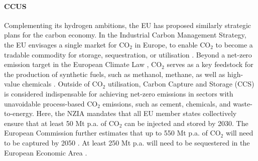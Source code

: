 \documentclass[pdflatex,sn-nature]{sn-jnl}%
\theoremstyle{thmstyleone}%
\theoremstyle{thmstyletwo}%
\theoremstyle{thmstylethree}%
\begin{document}
\paragraph{CCUS}
Complementing its hydrogen ambitions, the EU has proposed similarly strategic plans for the carbon economy. In the Industrial Carbon Management Strategy, the EU envisages a single market for CO$_2$ in Europe, to enable CO$_2$ to become a tradable commodity for storage, sequestration, or utilisation \cite{europeancourtofauditorsEUsIndustrialPolicy2024}. Beyond a net-zero emission target in the European Climate Law \cite{europeanparliamentRegulationEU20212021}, CO$_2$ serves as a key feedstock for the production of synthetic fuels, such as methanol, methane, as well as high-value chemicals \cite{neumannPotentialRoleHydrogen2023}. Outside of CO$_2$ utilisation, Carbon Capture and Storage (CCS) is considered indispensable for achieving net-zero emissions in sectors with unavoidable process-based CO$_2$ emissions, such as cement, chemicals, and waste-to-energy. Here, the NZIA mandates that all EU member states collectively ensure that at least 50 Mt p.a. of CO$_2$ can be injected and stored by 2030. The European Commission further estimates that up to 550 Mt p.a. of CO$_2$ will need to be captured by 2050 \cite{europeanparliamentRegulationEU20242024}. At least 250 Mt p.a. will need to be sequestered in the European Economic Area \cite{europeancommissionCommunicationCommissionEuropean2024}.
\end{document}
